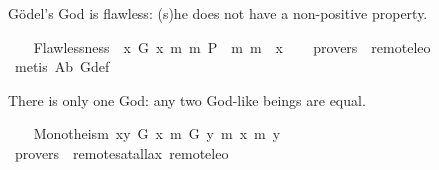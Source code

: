 %
\begin{isabellebody}%
\def\isabellecontext{GoedelGodExtensions}%
%
\isadelimtheory
%
\endisadelimtheory
%
\isatagtheory
%
\endisatagtheory
{\isafoldtheory}%
%
\isadelimtheory
%
\endisadelimtheory
%
\isamarkuptrue%
%
\begin{isamarkuptext}%
G\"odel's God is flawless: (s)he does not have a non-positive property.%
\end{isamarkuptext}%
\isamarkuptrue%
\ \ \isamarkupfalse%
\ Flawlessness{\isacharcolon}\ {\isachardoublequoteopen}{\isacharbrackleft}{\isasymforall}{\isacharparenleft}{\isasymlambda}{\isasymphi}{\isachardot}\ {\isasymforall}{\isacharparenleft}{\isasymlambda}x{\isachardot}\ {\isacharparenleft}G\ x\ m{\isasymrightarrow}\ {\isacharparenleft}m{\isasymnot}\ {\isacharparenleft}P\ {\isasymphi}{\isacharparenright}\ m{\isasymrightarrow}\ m{\isasymnot}\ {\isacharparenleft}{\isasymphi}\ x{\isacharparenright}{\isacharparenright}{\isacharparenright}{\isacharparenright}{\isacharparenright}{\isacharbrackright}{\isachardoublequoteclose}\isanewline
\ \ \isamarkupfalse%
\ {\isacharbrackleft}provers\ {\isacharequal}\ remote{\isacharunderscore}leo{}{\isacharbrackright}\ \isanewline
%
\isadelimproof
\ \ %
\endisadelimproof
%
\isatagproof
{}\isamarkupfalse%
\ {\isacharparenleft}metis\ A{}b\ G{\isacharunderscore}def{\isacharparenright}%
\endisatagproof
{\isafoldproof}%
%
\isadelimproof
%
\endisadelimproof
%
\begin{isamarkuptext}%
There is only one God: any two God-like beings are equal.%
\end{isamarkuptext}%
\isamarkuptrue%
\ \ \isamarkupfalse%
\ Monotheism{\isacharcolon}\ {\isachardoublequoteopen}{\isacharbrackleft}{\isasymforall}{\isacharparenleft}{\isasymlambda}x{\isachardot}{\isasymforall}{\isacharparenleft}{\isasymlambda}y{\isachardot}\ {\isacharparenleft}G\ x\ m{\isasymrightarrow}\ {\isacharparenleft}G\ y\ m{\isasymrightarrow}\ {\isacharparenleft}x\ m{\isacharequal}\ y{\isacharparenright}{\isacharparenright}{\isacharparenright}{\isacharparenright}{\isacharparenright}{\isacharbrackright}{\isachardoublequoteclose}\isanewline
\ \ \isamarkupfalse%
\ {\isacharbrackleft}provers\ {\isacharequal}\ remote{\isacharunderscore}satallax\ remote{\isacharunderscore}leo{}{\isacharbrackright}\ \isanewline
%
\isadelimproof
\ \ %
\endisadelimproof
%
\isatagproof
{}\isamarkupfalse%
\isanewline
\ \ \isanewline
%
\endisatagproof
{\isafoldproof}%
%
\isadelimproof
%
\endisadelimproof
%
\isadelimtheory
%
\endisadelimtheory
%
\isatagtheory
%
\endisatagtheory
{\isafoldtheory}%
%
\isadelimtheory
%
\endisadelimtheory
\ \end{isabellebody}%
